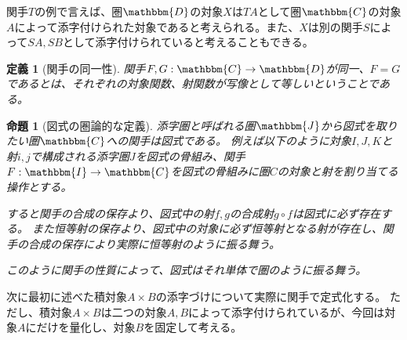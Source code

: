 \documentclass[uplatex,dvipdfmx]{jsarticle}
\newcommand{\cat}[1]{\mathbbm{#1}}
\newcommand{\arrow}{\rightarrow}
\newcommand{\functor}[3]{#1:\cat{#2}\arrow \cat{#3}}
\newtheorem{prop}{命題}[section]
\newtheorem{define}{定義}[section]
\numberwithin{proof}{subsection}
\numberwithin{prop}{subsection}
\numberwithin{define}{subsection}
\begin{document}
  関手$T$の例で言えば、圏$\cat{D}$の対象$X$は$TA$として圏$\cat{C}$の対象$A$によって添字付けられた対象であると考えられる。また、$X$は別の関手$S$によって$SA,SB$として添字付けられていると考えることもできる。

	\begin{define}[関手の同一性]
		関手$\functor{F,G}{C}{D}$が同一、$F=G$であるとは、それぞれの対象関数、射関数が写像として等しいということである。
	\end{define}


	\begin{prop}[図式の圏論的な定義]
		添字圏と呼ばれる圏$\cat{J}$から図式を取りたい圏$\cat{C}$への関手は図式である。
		例えば以下のように対象$I,J,K$と射$i,j$で構成される添字圏$J$を図式の骨組み、関手$\functor{F}{I}{C}$を図式の骨組みに圏$C$の対象と射を割り当てる操作とする。

		すると関手の合成の保存より、図式中の射$f,g$の合成射$g\circ f$は図式に必ず存在する。
    また恒等射の保存より、図式中の対象に必ず恒等射となる射が存在し、関手の合成の保存により実際に恒等射のように振る舞う。

    このように関手の性質によって、図式はそれ単体で圏のように振る舞う。
		\begin{center}
		\end{center}
	\end{prop}
  次に最初に述べた積対象$A\times B$の添字づけについて実際に関手で定式化する。
  ただし、積対象$A\times B$は二つの対象$A,B$によって添字付けられているが、今回は対象$A$にだけを量化し、対象$B$を固定して考える。
\end{document}
